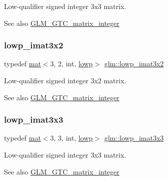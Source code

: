 Low-\/qualifier signed integer 3x3 matrix. \begin{DoxySeeAlso}{See also}
\hyperlink{group__gtc__matrix__integer}{G\+L\+M\+\_\+\+G\+T\+C\+\_\+matrix\+\_\+integer} 
\end{DoxySeeAlso}
\mbox{\label{group__gtc__matrix__integer_ga96983291e90cfeaecde4409ef1ec74dd}} 
\subsubsection{\texorpdfstring{lowp\+\_\+imat3x2}{lowp\_imat3x2}}
{\footnotesize\ttfamily typedef \hyperlink{structglm_1_1mat}{mat}$<$3, 2, int, \hyperlink{namespaceglm_a36ed105b07c7746804d7fdc7cc90ff25ae161af3fc695e696ce3bf69f7332bc2d}{lowp}$>$ \hyperlink{group__gtc__matrix__integer_ga96983291e90cfeaecde4409ef1ec74dd}{glm\+::lowp\+\_\+imat3x2}}

Low-\/qualifier signed integer 3x2 matrix. \begin{DoxySeeAlso}{See also}
\hyperlink{group__gtc__matrix__integer}{G\+L\+M\+\_\+\+G\+T\+C\+\_\+matrix\+\_\+integer} 
\end{DoxySeeAlso}
\mbox{\label{group__gtc__matrix__integer_ga4bfcfb2b121f76d9bff2fb2e4017173a}} 
\subsubsection{\texorpdfstring{lowp\+\_\+imat3x3}{lowp\_imat3x3}}
{\footnotesize\ttfamily typedef \hyperlink{structglm_1_1mat}{mat}$<$3, 3, int, \hyperlink{namespaceglm_a36ed105b07c7746804d7fdc7cc90ff25ae161af3fc695e696ce3bf69f7332bc2d}{lowp}$>$ \hyperlink{group__gtc__matrix__integer_ga4bfcfb2b121f76d9bff2fb2e4017173a}{glm\+::lowp\+\_\+imat3x3}}

Low-\/qualifier signed integer 3x3 matrix. \begin{DoxySeeAlso}{See also}
\hyperlink{group__gtc__matrix__integer}{G\+L\+M\+\_\+\+G\+T\+C\+\_\+matrix\+\_\+integer} 
\end{DoxySeeAlso}
\mbox{\label{group__gtc__matrix__integer_gacbdf7f35076058e4e9be49955ab3fbd3}} 
